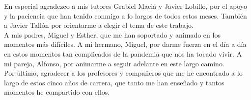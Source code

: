        \vspace{1cm}


En especial agradezco a mis tutores Grabiel Maciá y Javier Lobillo, por el apoyo y la paciencia que han tenido conmigo a lo largos de todos estos meses. También a Javier Tallón por orientarme a elegir el tema de este trabajo.\\

A mis padres, Miguel y Esther, que me han soportado y animado en los momentos más difíciles. A mi hermano, Miguel, por darme fuerza en el día a día en estos momentos tan complicados de la pandemia que nos ha tocado vivir. A mi pareja, Alfonso, por animarme a seguir adelante en este largo camino.\\

Por último, agradecer a los profesores y compañeros que me he encontrado a lo largo de estos cinco años de carrera, que tanto me han enseñado y tantos momentos he compartido con ellos.\\
